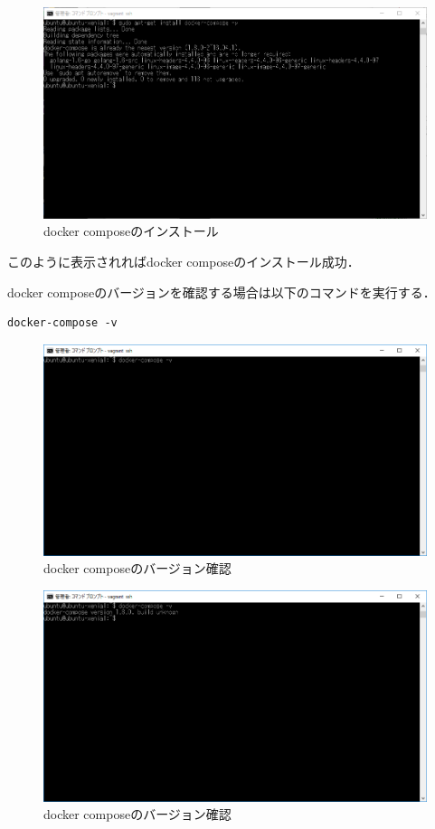 \begin{figure}[h]
\centering
\includegraphics[width=12cm]{dockercomposeinstall2.PNG}
\caption{docker composeのインストール}\label{サンプル図}
\end{figure}

このように表示されればdocker composeのインストール成功．


\newpage



docker composeのバージョンを確認する場合は以下のコマンドを実行する．

\begin{verbatim}
docker-compose -v
\end{verbatim}



\begin{figure}[h]
\centering
\includegraphics[width=12cm]{dockercomposeversion.PNG}
\caption{docker composeのバージョン確認}\label{サンプル図}
\end{figure}



\begin{figure}[h]
\centering
\includegraphics[width=12cm]{dockercomposeversion2.PNG}
\caption{docker composeのバージョン確認}\label{サンプル図}
\end{figure}


